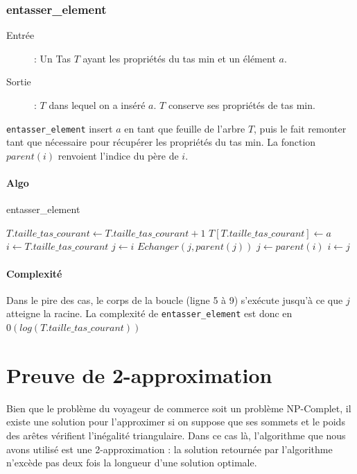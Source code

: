 \documentclass[a4paper,11pt]{article}
\begin{document}
\subsubsection*{entasser\_element}
\begin{description}
\item[Entrée] :  Un \textsf{Tas} $T$ ayant les propriétés du tas min et un élément $a$.
\item[Sortie] :  $T$ dans lequel on a inséré $a$. $T$ conserve ses propriétés de tas min.
\end{description}
\texttt{entasser\_element} insert $a$ en tant que feuille de l'arbre $T$, puis le fait remonter tant que nécessaire pour récupérer les propriétés du tas min.
La fonction $parent(i)$ renvoient l'indice du père de $i$.
\paragraph*{Algo}
\begin{algorithm}[h!]
\caption{entasser\_element}
\begin{algorithmic}[1]
\STATE $T.taille\_tas\_courant \leftarrow T.taille\_tas\_courant + 1$
\STATE $T\left[T.taille\_tas\_courant\right] \leftarrow a$
\STATE $i \leftarrow T.taille\_tas\_courant$
\STATE $j \leftarrow i$
\STATE $Echanger(j, parent(j))$
\STATE $j \leftarrow parent(i)$
\STATE $i \leftarrow j$
\ENDWHILE
\end{algorithmic}
\end{algorithm}
\paragraph*{Complexité}
Dans le pire des cas, le corps de la boucle (ligne 5 à 9) s'exécute jusqu'à ce que $j$ atteigne la racine. La complexité de \texttt{entasser\_element} est donc en $0(log(T.taille\_tas\_courant))$


\section{Preuve de 2-approximation} %
Bien que le problème du voyageur de commerce soit un problème NP-Complet, il existe une solution pour l'approximer si on suppose que ses sommets et le poids des arêtes vérifient l'inégalité triangulaire. Dans ce cas là, l'algorithme que nous avons utilisé est une 2-approximation : la solution retournée par l'algorithme n'excède pas deux fois la longueur d'une solution optimale.
\end{document}
